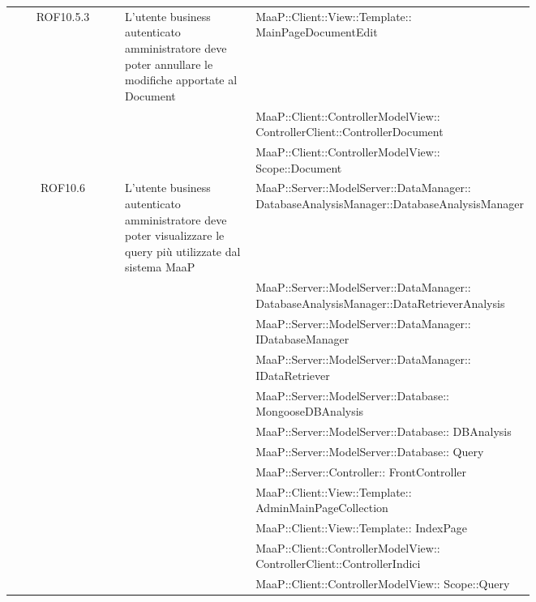 \begin{center}
\begin{longtable}{|c|p{0.25\linewidth}|p{0.5\linewidth}|}
\midrule
ROF10.5.3
& L'utente business autenticato amministratore deve poter annullare le modifiche apportate al Document
& MaaP::Client::View::Template:: MainPageDocumentEdit\\
& & MaaP::Client::ControllerModelView:: ControllerClient::ControllerDocument\\
& & MaaP::Client::ControllerModelView:: Scope::Document\\

\midrule
ROF10.6
& L'utente business autenticato amministratore deve poter visualizzare le query più utilizzate dal sistema MaaP
& MaaP::Server::ModelServer::DataManager:: DatabaseAnalysisManager::DatabaseAnalysisManager\\
& & MaaP::Server::ModelServer::DataManager:: DatabaseAnalysisManager::DataRetrieverAnalysis\\
& & MaaP::Server::ModelServer::DataManager:: IDatabaseManager\\
& & MaaP::Server::ModelServer::DataManager:: IDataRetriever\\
& & MaaP::Server::ModelServer::Database:: MongooseDBAnalysis\\
& & MaaP::Server::ModelServer::Database:: DBAnalysis\\
& & MaaP::Server::ModelServer::Database:: Query\\
& & MaaP::Server::Controller:: FrontController\\
& & MaaP::Client::View::Template:: AdminMainPageCollection\\
& & MaaP::Client::View::Template:: IndexPage\\
& & MaaP::Client::ControllerModelView:: ControllerClient::ControllerIndici\\
& & MaaP::Client::ControllerModelView:: Scope::Query\\


\end{longtable}
\end{center}
